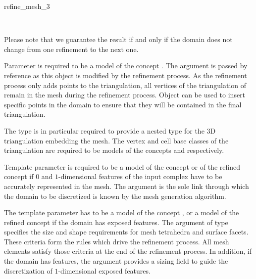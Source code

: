 \begin{ccRefFunction}{refine_mesh_3}
\begin{ccAdvanced}
\\

Please note that we guarantee the result if and only if the domain does
not change from one refinement to the next one.
\end{ccAdvanced}


\ccParameters

Parameter  is required to be a model of
the concept 
.
The argument  is passed by
reference as this object is modified by the refinement process. As the
refinement process only adds points to the triangulation, all 
vertices of the triangulation of  remain in the
mesh during the refinement process. Object  can be used to insert
specific points in the domain to ensure that they will be contained in the
final triangulation.

The type  is in particular required to provide a nested type
 for the 3D triangulation
embedding the mesh. The vertex and cell base classes of the
triangulation  are required to be models of the
concepts  and 
respectively.

Template parameter  is required to be a model of
the concept   or of the refined concept
 if $0$ and $1$-dimensional features
of the input complex have to be accurately represented in the mesh.
The argument 
 is the sole link through which the domain
to be discretized is known  by the mesh generation algorithm. 




The template parameter  has to be a model of the concept
, or a model of  the refined concept  if the domain has exposed features.
The argument   of 
type   specifies the
size and shape requirements for  mesh tetrahedra
and  surface facets. These criteria
form the rules which drive the refinement process. All mesh elements
satisfy those criteria at the end of the refinement process.
In addition, if the domain has  features, the argument
 provides a sizing field to guide the discretization
of $1$-dimensional exposed features.
 

\end{ccRefFunction}
